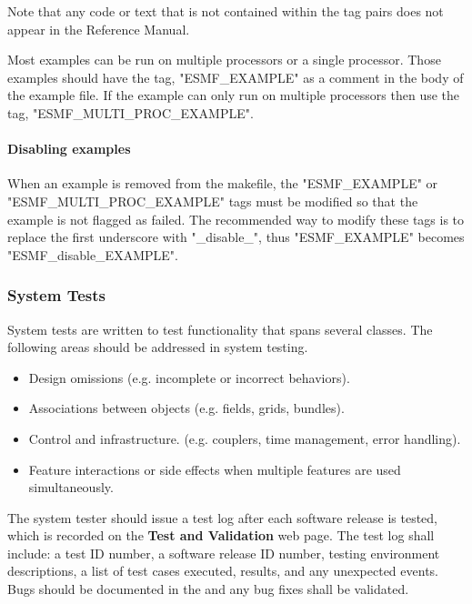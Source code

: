 Note that any code or text that is not contained within the tag pairs does not appear in the
Reference Manual.

\begin{sloppypar}
Most examples can be run on multiple processors or a single processor. Those examples should
have the tag, "ESMF\_EXAMPLE" as a comment in the body of the example file. If the example
can only run on multiple processors then use the tag, "ESMF\_MULTI\_PROC\_EXAMPLE".

\paragraph{Disabling examples}
When an example is removed from the makefile, the "ESMF\_EXAMPLE" or 
"ESMF\_MULTI\_PROC\_EXAMPLE"
tags must be modified so that the example is not flagged as failed. 
The recommended way to modify these tags is to replace the first underscore with "\_disable\_", 
thus "ESMF\_EXAMPLE" becomes
"ESMF\_disable\_EXAMPLE".
\end{sloppypar}

\subsubsection{System Tests}

System tests are written to test functionality that spans several
classes.  The following areas should be addressed in system testing.

\begin{itemize}
\item Design omissions (e.g. incomplete or incorrect behaviors).
\item Associations between objects (e.g. fields, grids, bundles).
\item Control and infrastructure. (e.g. couplers, time management, error handling).
\item Feature interactions or side effects when multiple features are used
simultaneously.
\end{itemize}

The system tester should issue a test log after each software release is tested,
which is recorded on the {\bf Test and Validation} web page. The test
log shall
include: a test ID number, a software release ID number, testing environment
descriptions, a list of test cases executed, results, and any unexpected
events. Bugs should be documented in the  and
any bug fixes shall be validated.

